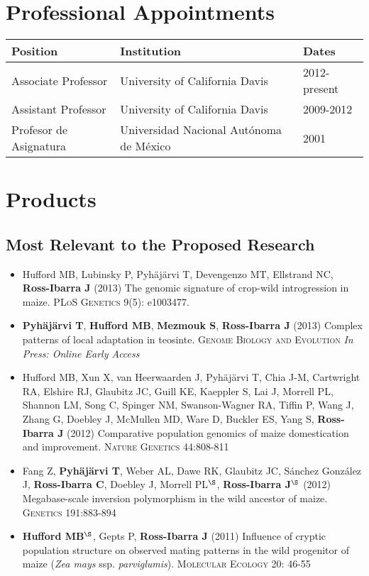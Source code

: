 \documentclass[11pt]{article}
\begin{document}
\section{Professional Appointments}

\begin{tabular}{l l l}
Position & Institution                 & Dates\\
\hline
Associate Professor & University of California Davis &		2012-present \\
Assistant Professor & University of California Davis &		2009-2012 \\
Profesor de Asignatura & Universidad Nacional Aut\'{o}noma de M\'{e}xico & 2001 \\
\hline
\end{tabular}

\section{Products}

\subsection*{Most Relevant to the Proposed Research}

\begin{itemize} \setlength{\itemsep}{0pt} \setlength{\parskip}{2pt} \setlength{\parsep}{0pt}

\item Hufford MB, Lubinsky P, Pyh\"aj\"arvi T, Devengenzo MT, Ellstrand NC, {\bf Ross-Ibarra J} (2013) The genomic signature of crop-wild introgression in maize. \textsc{PLoS Genetics} 9(5): e1003477. 

\item {\bf Pyh\"aj\"arvi T}, {\bf Hufford MB}, {\bf Mezmouk S}, {\bf Ross-Ibarra J} (2013) Complex patterns of local adaptation in teosinte. \textsc{Genome Biology and Evolution} \emph{In Press: Online Early Access}

\item Hufford MB, Xun X, van Heerwaarden J, Pyh\"aj\"arvi T, Chia J-M, Cartwright RA, Elshire RJ, Glaubitz JC, Guill KE, Kaeppler S, Lai J, Morrell PL, Shannon LM, Song C, Spinger NM, Swanson-Wagner RA, Tiffin P, Wang J, Zhang G, Doebley J, McMullen MD, Ware D, Buckler ES, Yang S, {\bf Ross-Ibarra J} (2012) Comparative population genomics of maize domestication and improvement. \textsc{Nature Genetics} 44:808-811

\item Fang Z, {\bf Pyh\"aj\"arvi T}, Weber AL, Dawe RK, Glaubitz JC, S\'{a}nchez Gonz\'{a}lez J, {\bf Ross-Ibarra C}, Doebley J, Morrell PL$^\S$, {\bf Ross-Ibarra J}$^\S$  (2012) Megabase-scale inversion polymorphism in the wild ancestor of maize. \textsc{Genetics} 191:883-894 

\item {\bf Hufford MB}$^\S$, Gepts P, {\bf Ross-Ibarra J} (2011) Influence of cryptic population structure on observed mating patterns in the wild progenitor of maize (\emph{Zea mays} ssp. \emph{parviglumis}).  \textsc{Molecular Ecology} 20: 46-55

\end{itemize}
\end{document}
